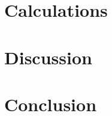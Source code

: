 \documentclass[12pt,letterpaper,titlepage]{report}
\begin{document}
\bigskip
\bigskip

\begin{minipage}{\linewidth}
\centering
{}

\end{minipage}




\section*{Calculations}




\section*{Discussion}




\section*{Conclusion}


\end{document}
